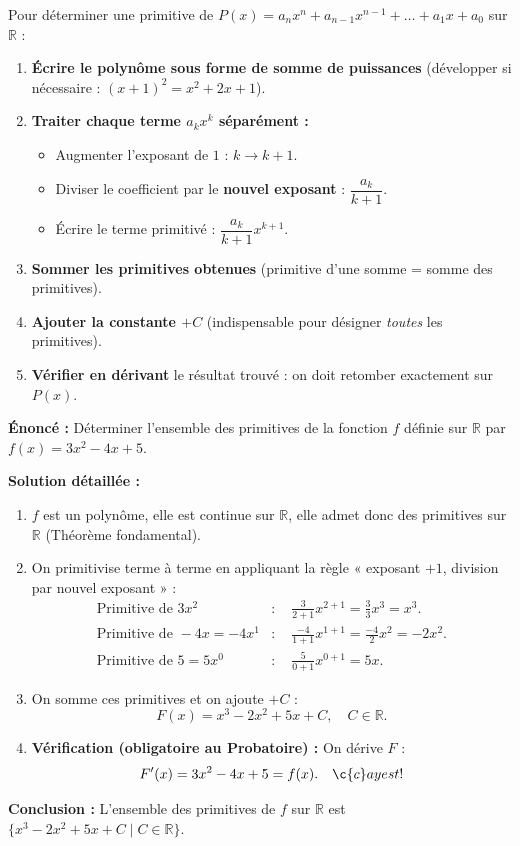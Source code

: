 \documentclass[11pt]{article}
\begin{document}
\begin{methode}
Pour déterminer une primitive de $P(x) = a_n x^n + a_{n-1} x^{n-1} + \dots + a_1 x + a_0$ sur $\mathbb{R}$ :
\begin{enumerate}
    \item \textbf{Écrire le polynôme sous forme de somme de puissances} (développer si nécessaire : $(x+1)^2 = x^2+2x+1$).
    \item \textbf{Traiter chaque terme $a_k x^k$ séparément :}
    \begin{itemize}
        \item Augmenter l'exposant de $1$ : $k \to k+1$.
        \item Diviser le coefficient par le \textbf{nouvel exposant} : $\dfrac{a_k}{k+1}$.
        \item Écrire le terme primitivé : $\dfrac{a_k}{k+1} x^{k+1}$.
    \end{itemize}
    \item \textbf{Sommer les primitives obtenues} (primitive d'une somme = somme des primitives).
    \item \textbf{Ajouter la constante $+C$} (indispensable pour désigner \emph{toutes} les primitives).
    \item \textbf{Vérifier en dérivant} le résultat trouvé : on doit retomber exactement sur $P(x)$.
\end{enumerate}
\end{methode}

\begin{exoresolu}
\textbf{Énoncé :} Déterminer l'ensemble des primitives de la fonction $f$ définie sur $\mathbb{R}$ par $f(x) = 3x^2 - 4x + 5$.

\textbf{Solution détaillée :}
\begin{enumerate}
    \item $f$ est un polynôme, elle est continue sur $\mathbb{R}$, elle admet donc des primitives sur $\mathbb{R}$ (Théorème fondamental).
    \item On primitivise terme à terme en appliquant la règle « exposant $+1$, division par nouvel exposant » :
    \begin{align*}
        \text{Primitive de } 3x^2 &: \quad \frac{3}{2+1} x^{2+1} = \frac{3}{3}x^3 = x^3. \\
        \text{Primitive de } -4x = -4x^1 &: \quad \frac{-4}{1+1} x^{1+1} = \frac{-4}{2}x^2 = -2x^2. \\
        \text{Primitive de } 5 = 5x^0 &: \quad \frac{5}{0+1} x^{0+1} = 5x.
    \end{align*}
    \item On somme ces primitives et on ajoute $+C$ :
    \[
    F(x) = x^3 - 2x^2 + 5x + C, \quad C \in \mathbb{R}.
    \]
    \item \textbf{Vérification (obligatoire au Probatoire) :} On dérive $F$ :
    \[
    F'(x) = 3x^2 - 4x + 5 = f(x). \quad \c{c}a y est !
    \]
\end{enumerate}
\textbf{Conclusion :} L'ensemble des primitives de $f$ sur $\mathbb{R}$ est $\{ x^3 - 2x^2 + 5x + C \mid C \in \mathbb{R} \}$.
\end{exoresolu}
\end{document}
